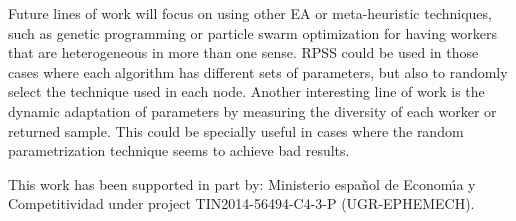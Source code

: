 
Future lines of work will focus on using other EA or meta-heuristic techniques, 
such as genetic programming or particle swarm optimization for having 
workers that are heterogeneous in more than one sense. RPSS could be
used in those cases where each algorithm has different sets of
parameters, but also to randomly select the technique used in each
node. Another interesting line of work is the dynamic adaptation of
parameters by measuring the diversity of each worker or returned
sample. This could be specially useful in cases where the random
parametrization technique seems to achieve bad results. 

\begin{acks}
This work has been supported in part by:  Ministerio espa\~{n}ol de
Econom\'{\i}a y Competitividad under project TIN2014-56494-C4-3-P
(UGR-EPHEMECH).
\end{acks}

